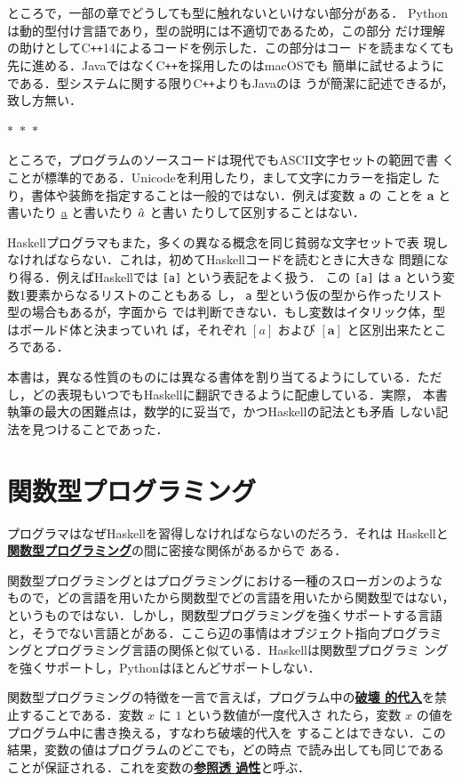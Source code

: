 \documentclass[a5paper,twoside,fleqn,draft]{jsbook}
\newcommand{\separator}{\begin{center}$*$~$*$~$*$\end{center}}
\newcommand{\programminglanguage}[1]{\textsf{#1}}
\newcommand{\cxx}{\programminglanguage{C}\texttt{++}}
\newcommand{\cxxfourteen}{\cxx\programminglanguage{14}}
\newcommand{\haskell}{\programminglanguage{Haskell}}
\newcommand{\java}{\programminglanguage{Java}}
\newcommand{\python}{\programminglanguage{Python}}
\newcommand{\keyword}[1]{{\underline{\textbf{#1}}}}
\newcommand{\code}[1]{\texttt{#1}}
\newcommand{\mType}[1]{\mathbf{#1}} %
\newcommand{\mA}{\mType{a}}
\begin{document}
ところで，一部の章でどうしても型に触れないといけない部分がある．
\python は動的型付け言語であり，型の説明には不適切であるため，この部分
だけ理解の助けとして\cxxfourteen によるコードを例示した．この部分はコー
ドを読まなくても先に進める．\java ではなく\cxx を採用したのはmacOSでも
簡単に試せるようにである．型システムに関する限り\cxx よりも\java のほ
うが簡潔に記述できるが，致し方無い．

\separator

ところで，プログラムのソースコードは現代でもASCII文字セットの範囲で書
くことが標準的である．Unicodeを利用したり，まして文字にカラーを指定し
たり，書体や装飾を指定することは一般的ではない．例えば変数 \code{a} の
ことを \textbf{a} と書いたり \underline{a} と書いたり $\Hat a$ と書い
たりして区別することはない．

\haskell プログラマもまた，多くの異なる概念を同じ貧弱な文字セットで表
現しなければならない．これは，初めて\haskell コードを読むときに大きな
問題になり得る．例えば\haskell では \code{[a]} という表記をよく扱う．
この \code{[a]} は \code{a} という変数1要素からなるリストのこともある
し， \code{a} 型という仮の型から作ったリスト型の場合もあるが，字面から
では判断できない．もし変数はイタリック体，型はボールド体と決まっていれ
ば，それぞれ $[a]$ および $[\mA]$ と区別出来たところである．

本書は，異なる性質のものには異なる書体を割り当てるようにしている．ただ
し，どの表現もいつでも\haskell に翻訳できるように配慮している．実際，
本書執筆の最大の困難点は，数学的に妥当で，かつ\haskell の記法とも矛盾
しない記法を見つけることであった．

\section{関数型プログラミング}

プログラマはなぜ\haskell を習得しなければならないのだろう．それは
\haskell と\keyword{関数型プログラミング}の間に密接な関係があるからで
ある．

関数型プログラミングとはプログラミングにおける一種のスローガンのような
もので，どの言語を用いたから関数型でどの言語を用いたから関数型ではない，
というものではない．しかし，関数型プログラミングを強くサポートする言語
と，そうでない言語とがある．ここら辺の事情はオブジェクト指向プログラミ
ングとプログラミング言語の関係と似ている．\haskell は関数型プログラミ
ングを強くサポートし，\python はほとんどサポートしない．

関数型プログラミングの特徴を一言で言えば，プログラム中の\keyword{破壊
  的代入}を禁止することである．変数 $x$ に $1$ という数値が一度代入さ
れたら，変数 $x$ の値をプログラム中に書き換える，すなわち破壊的代入を
することはできない．この結果，変数の値はプログラムのどこでも，どの時点
で読み出しても同じであることが保証される．これを変数の\keyword{参照透
  過性}と呼ぶ．
\end{document}
